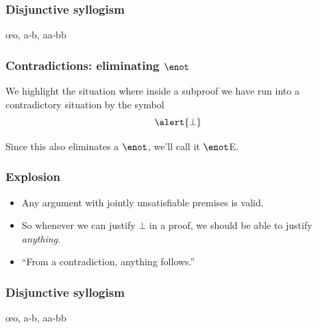 \begin{frame}
  \frametitle{Disjunctive syllogism}
  \begin{fitchproof}
    \open
     
    \close
    \open
    \ellipsesline
    \close
     \oe{o, a-b, aa-bb}
  \end{fitchproof}
\end{frame}

\begin{frame}
  \frametitle{Contradictions: eliminating $\enot$}

  We highlight the situation where inside a subproof we have run into
  a contradictory situation by the symbol \[\alert{\bot}\]

  \begin{fitchproof}
     
  \end{fitchproof}

  Since this also eliminates a $\enot$, we'll call it $\enot$E.
\end{frame}

\begin{frame}
  \frametitle{Explosion}

  \begin{itemize}[<+->]
  \item Any argument with jointly unsatisfiable premises is valid.
  \item So whenever we can justify $\bot$ in a proof, we should be able to
  justify \emph{anything}.
  \item ``From a contradiction, anything follows.''

  \begin{fitchproof}
     
  \end{fitchproof}
  \end{itemize}
\end{frame}

\begin{frame}
  \frametitle{Disjunctive syllogism}
  \begin{fitchproof}
    \open
     
    \close
    \open
    \close
     \oe{o, a-b, aa-bb}
  \end{fitchproof}
\end{frame}

